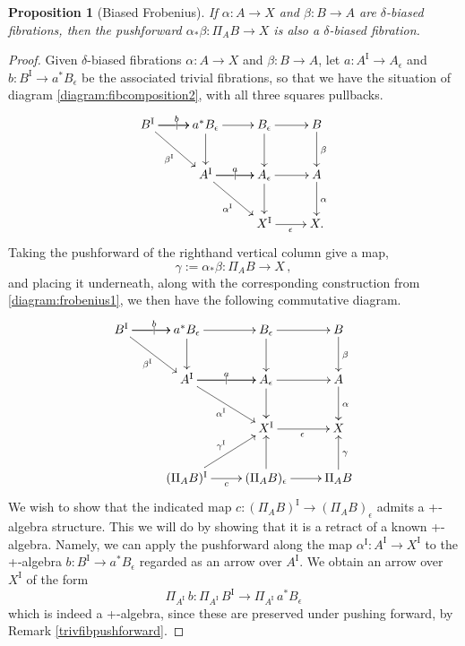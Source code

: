\documentclass[11pt]{amsart}
\newcommand{\ra}{\ensuremath{\rightarrow}}
\renewcommand{\to}{\ensuremath{\rightarrow}}
\newcommand{\too}{\ensuremath{\longrightarrow}}
\newcommand{\I}{\ensuremath{\mathrm{I}}}
\newtheorem{proposition}[theorem]{Proposition}
\newtheorem{lemma}[theorem]{Lemma}
\theoremstyle{remark}
\theoremstyle{definition}
\begin{document}

\begin{proposition}[Biased Frobenius]\label{prop:Frobenius}
If $\alpha : A \ra X$ and $\beta: B\ra A$  are $\delta$-biased fibrations, then the pushforward $\alpha_*\beta : \Pi_AB \ra X$ is also a $\delta$-biased fibration.
\end{proposition}

\begin{proof}
Given $\delta$-biased fibrations $\alpha : A \ra X$ and $\beta: B\ra A$, let $a : A^\I \ra A_\epsilon$ and $b : B^\I \ra a^*B_\epsilon$ be the associated trivial fibrations, so that we have the situation of diagram \eqref{diagram:fibcomposition2}, with all three squares pullbacks.
\begin{equation}\label{diagram:frobenius1.5}
\xymatrix{
B^\I \ar[r]|| \ar[r]^{b} \ar[rd]_{\beta^\I}  & a^*B_\epsilon \ar[r]  \ar[d]  & B_{\epsilon}  \ar[d]   \ar[r] & B \ar[d]^\beta \\
&A^\I \ar[r]|| \ar[r]^{a} \ar[rd]_{\alpha^\I}  & A_{\epsilon} \ar[d]   \ar[r] & A \ar[d]^\alpha \\
&& X^\I \ar[r]_{\epsilon} &  X.
}
\end{equation}
Taking the pushforward of the righthand vertical column give a map, 
\[
\gamma:= \alpha_*\beta : \Pi_A{B} \to X\,,
\]
and placing it underneath, along with the corresponding construction from \eqref{diagram:frobenius1}, we then have the following commutative diagram.
 \begin{equation}\label{diagram:frobenius2}
\xymatrix{
B^\I \ar[r]|| \ar[r]^{b} \ar[rd]_{\beta^\I}  & a^*B_\epsilon \ar[r]  \ar[d]  & B_{\epsilon}  \ar[d]   \ar[r] & B \ar[d]^\beta \\
& A^\I \ar[r]|| \ar[r]^{a} \ar[rd]_{\alpha^\I}  & A_{\epsilon} \ar[d]   \ar[r] & A \ar[d]^\alpha \\
&& X^\I \ar[r]_{\epsilon} &  X \\
& (\Pi_AB)^\I  \ar[r]_c  \ar[ru]^{\gamma^\I} & (\Pi_AB)_\epsilon  \ar[u] \ar[r] & \Pi_AB \ar[u]_\gamma 
}
\end{equation}
We wish to show that the indicated  map $c : (\Pi_AB)^\I \ra (\Pi_AB)_\epsilon$
admits a +-algebra structure. This we will do by showing that it is a retract of a known +-algebra.
Namely, we can apply the pushforward along the map $\alpha^\I:A^\I \ra X^\I$ to the +-algebra $b : B^\I \ra a^*B_\epsilon$ regarded as an arrow over $A^\I$.  We obtain an arrow over $X^\I$ of the form
\begin{equation}\label{plusalgretract}
\Pi_{A^\I}\,b :  \Pi_{A^\I}\,B^\I \too \Pi_{A^\I}\,a^*B_\epsilon 
\end{equation}
which is indeed a +-algebra, since these are preserved under pushing forward, by Remark \ref{trivfibpushforward}.


\end{proof}
\end{document}
